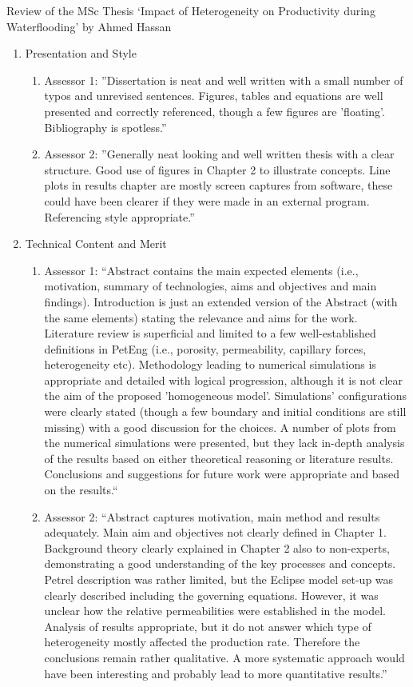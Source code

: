 \documentclass[14pt,twoside]{report}
\begin{document}
\begin{center}
  {\Large Review of the MSc Thesis `Impact of Heterogeneity on Productivity during Waterflooding' by Ahmed Hassan}
\end{center}
\begin{enumerate}%
\item Presentation and Style
    \begin{enumerate}%
       \item Assessor 1: ''Dissertation is neat and well written with a small number of typos and unrevised sentences. Figures, tables and equations are well presented and correctly referenced, though a few figures are 'floating'. Bibliography is spotless.''
       \item Assessor 2: ''Generally neat looking and well written thesis with a clear structure. Good use of figures in Chapter 2 to illustrate concepts. Line plots in results chapter are mostly screen captures from software, these could have been clearer if they were made in an external program. Referencing style appropriate.''
    \end{enumerate}
%  
   \item Technical Content and Merit
    \begin{enumerate}%
       \item Assessor 1: ``Abstract contains the main expected elements (i.e., motivation, summary of technologies, aims and objectives and main findings). Introduction is just an extended version of the Abstract (with the same elements) stating the relevance and aims for the work. Literature review is superficial and limited to a few well-established definitions in PetEng (i.e., porosity, permeability, capillary forces, heterogeneity etc). Methodology leading to numerical simulations is appropriate and detailed with logical progression, although it is not clear the aim of the proposed 'homogeneous model'. Simulations' configurations were clearly stated (though a few boundary and initial conditions are still missing) with a good discussion for the choices. A number of plots from the numerical simulations were presented, but they lack in-depth analysis of the results based on either theoretical reasoning or literature results. Conclusions and suggestions for future work were appropriate and based on the results.``
       \item Assessor 2: ``Abstract captures motivation, main method and results adequately. Main aim and objectives not clearly defined in Chapter 1. Background theory clearly explained in Chapter 2 also to non-experts, demonstrating a good understanding of the key processes and concepts. Petrel description was rather limited, but the Eclipse model set-up was clearly described including the governing equations. However, it was unclear how the relative permeabilities were established in the model. Analysis of results appropriate, but it do not answer which type of heterogeneity mostly affected the production rate. Therefore the conclusions remain rather qualitative. A more systematic approach would have been interesting and probably lead to more quantitative results.''

\end{enumerate}
\end{enumerate}
\end{document}
